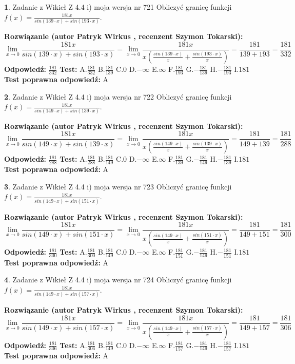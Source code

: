 \documentclass[12pt, a4paper]{article}
\theoremstyle{definition} %
\newtheorem{zad}{}
\newcommand{\zadStart}[1]{\begin{zad}#1\newline}
\newcommand{\zadStop}{\end{zad}}
\newcommand{\rozwStart}[2]{\noindent \textbf{Rozwiązanie (autor #1 , recenzent #2): }\newline}
\newcommand{\rozwStop}{\newline}
\newcommand{\odpStart}{\noindent \textbf{Odpowiedź:}\newline}
\newcommand{\odpStop}{\newline}
\newcommand{\testStart}{\noindent \textbf{Test:}\newline}
\newcommand{\testStop}{\newline}
\newcommand{\kluczStart}{\noindent \textbf{Test poprawna odpowiedź:}\newline}
\newcommand{\kluczStop}{\newline}
\begin{document}
\zadStart{Zadanie z Wikieł Z 4.4 i) moja wersja nr 721}
Obliczyć granicę funkcji $f(x)=\frac{181x}{sin(139\cdot x) +sin(193\cdot x)}$.
\zadStop
\rozwStart{Patryk Wirkus}{Szymon Tokarski}
$$\lim\limits_{x\to 0}\frac{181x}{sin(139\cdot x) +sin(193\cdot x)}=\lim\limits_{x\to 0}\frac{181x}{x(\frac{sin(139\cdot x)}{x}+\frac{sin(193\cdot x)}{x})}=\frac{181}{139+193} = \frac{181}{332}$$
\rozwStop
\odpStart
$\frac{181}{332}$
\odpStop
\testStart
A.$\frac{181}{332}$
B.$\frac{181}{139}$
C.$0$
D.$-\infty$
E.$\infty$
F.$\frac{181}{193}$
G.$-\frac{181}{139}$
H.$-\frac{181}{193}$
I.$181$
\testStop
\kluczStart
A
\kluczStop



\zadStart{Zadanie z Wikieł Z 4.4 i) moja wersja nr 722}
Obliczyć granicę funkcji $f(x)=\frac{181x}{sin(149\cdot x) +sin(139\cdot x)}$.
\zadStop
\rozwStart{Patryk Wirkus}{Szymon Tokarski}
$$\lim\limits_{x\to 0}\frac{181x}{sin(149\cdot x) +sin(139\cdot x)}=\lim\limits_{x\to 0}\frac{181x}{x(\frac{sin(149\cdot x)}{x}+\frac{sin(139\cdot x)}{x})}=\frac{181}{149+139} = \frac{181}{288}$$
\rozwStop
\odpStart
$\frac{181}{288}$
\odpStop
\testStart
A.$\frac{181}{288}$
B.$\frac{181}{149}$
C.$0$
D.$-\infty$
E.$\infty$
F.$\frac{181}{139}$
G.$-\frac{181}{149}$
H.$-\frac{181}{139}$
I.$181$
\testStop
\kluczStart
A
\kluczStop



\zadStart{Zadanie z Wikieł Z 4.4 i) moja wersja nr 723}
Obliczyć granicę funkcji $f(x)=\frac{181x}{sin(149\cdot x) +sin(151\cdot x)}$.
\zadStop
\rozwStart{Patryk Wirkus}{Szymon Tokarski}
$$\lim\limits_{x\to 0}\frac{181x}{sin(149\cdot x) +sin(151\cdot x)}=\lim\limits_{x\to 0}\frac{181x}{x(\frac{sin(149\cdot x)}{x}+\frac{sin(151\cdot x)}{x})}=\frac{181}{149+151} = \frac{181}{300}$$
\rozwStop
\odpStart
$\frac{181}{300}$
\odpStop
\testStart
A.$\frac{181}{300}$
B.$\frac{181}{149}$
C.$0$
D.$-\infty$
E.$\infty$
F.$\frac{181}{151}$
G.$-\frac{181}{149}$
H.$-\frac{181}{151}$
I.$181$
\testStop
\kluczStart
A
\kluczStop



\zadStart{Zadanie z Wikieł Z 4.4 i) moja wersja nr 724}
Obliczyć granicę funkcji $f(x)=\frac{181x}{sin(149\cdot x) +sin(157\cdot x)}$.
\zadStop
\rozwStart{Patryk Wirkus}{Szymon Tokarski}
$$\lim\limits_{x\to 0}\frac{181x}{sin(149\cdot x) +sin(157\cdot x)}=\lim\limits_{x\to 0}\frac{181x}{x(\frac{sin(149\cdot x)}{x}+\frac{sin(157\cdot x)}{x})}=\frac{181}{149+157} = \frac{181}{306}$$
\rozwStop
\odpStart
$\frac{181}{306}$
\odpStop
\testStart
A.$\frac{181}{306}$
B.$\frac{181}{149}$
C.$0$
D.$-\infty$
E.$\infty$
F.$\frac{181}{157}$
G.$-\frac{181}{149}$
H.$-\frac{181}{157}$
I.$181$
\testStop
\kluczStart
A
\kluczStop
\end{document}
